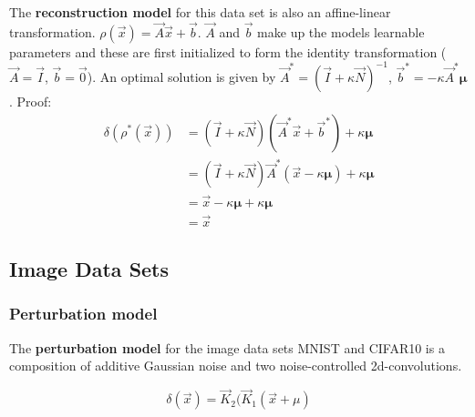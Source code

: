 The \textbf{reconstruction model} for this data set is also an affine-linear transformation. 
$\rho(\vec x) = \vec A \vec x + \vec b$.
$\vec A$ and $\vec b$ make up the models learnable parameters and
these are first initialized to form the identity transformation ($\vec A = \vec I$, $\vec b = \vec 0$).
An optimal solution is given by
$\vec A^* = (\vec I + \kappa \vec N)^{-1}$, $\vec b^* = -\kappa \vec A^* \boldsymbol \mu$.
Proof:
\begin{equation}
\label{eqn:gmm_optimal}
\begin{split}
    \delta ( \rho^* (\vec x)) &= (\vec I + \kappa \vec N)(\vec A^* \vec x + \vec b^*) + \kappa \boldsymbol \mu \\
    &= (\vec I + \kappa \vec N)\vec A^* (\vec x  - \kappa \boldsymbol \mu) + \kappa \boldsymbol \mu \\
    &= \vec x  -\kappa \boldsymbol \mu + \kappa \boldsymbol \mu \\
    &= \vec x
\end{split}
\end{equation}

\subsection{Image Data Sets}

\subsubsection{Perturbation model}

The \textbf{perturbation model} for the image data sets MNIST and CIFAR10
is a composition of additive Gaussian noise and two noise-controlled 2d-convolutions.

\[
    \delta(\vec x) = \vec K_2(\vec K_1(\vec x + \mu)
\]


